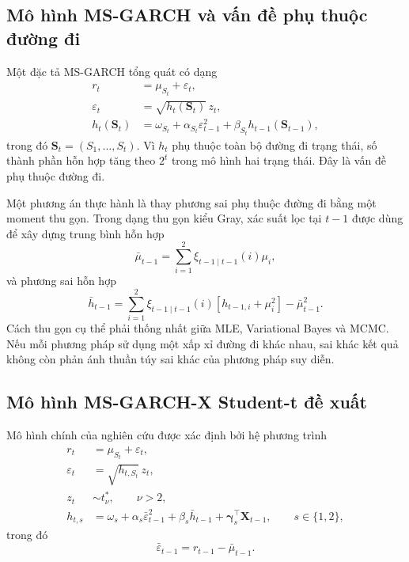 \documentclass[12pt,a4paper]{article}
\numberwithin{equation}{section}
\newcommand{\bm}[1]{\symbf{#1}}
\newcommand{\Xvec}{\bm{X}}
\begin{document}
\subsection{Mô hình MS-GARCH và vấn đề phụ thuộc đường đi}\label{subsec:msgarch-path}

Một đặc tả MS-GARCH tổng quát có dạng
\begin{align}
  r_t &= \mu_{S_t}+\varepsilon_t, \\
  \varepsilon_t &= \sqrt{h_t(\bm S_t)}\,z_t, \\
  h_t(\bm S_t)
  &=
  \omega_{S_t}
  +\alpha_{S_t}\varepsilon_{t-1}^{2}
  +\beta_{S_t}h_{t-1}(\bm S_{t-1}),
  \label{eq:path-dependent-msgarch}
\end{align}
trong đó $\bm S_t=(S_1,\ldots,S_t)$. Vì $h_t$ phụ thuộc toàn bộ đường đi trạng thái, số thành phần hỗn hợp tăng theo $2^t$ trong mô hình hai trạng thái. Đây là vấn đề phụ thuộc đường đi.

Một phương án thực hành là thay phương sai phụ thuộc đường đi bằng một moment thu gọn. Trong dạng thu gọn kiểu Gray, xác suất lọc tại $t-1$ được dùng để xây dựng trung bình hỗn hợp
\begin{equation}
  \bar\mu_{t-1}
  =
  \sum_{i=1}^{2}\xi_{t-1\mid t-1}(i)\mu_i,
  \label{eq:collapsed-mean}
\end{equation}
và phương sai hỗn hợp
\begin{equation}
  \bar h_{t-1}
  =
  \sum_{i=1}^{2}\xi_{t-1\mid t-1}(i)
  \left[h_{t-1,i}+\mu_i^2\right]
  -\bar\mu_{t-1}^{2}.
  \label{eq:collapsed-variance}
\end{equation}
Cách thu gọn cụ thể phải thống nhất giữa MLE, Variational Bayes và MCMC. Nếu mỗi phương pháp sử dụng một xấp xỉ đường đi khác nhau, sai khác kết quả không còn phản ánh thuần túy sai khác của phương pháp suy diễn.

\subsection{Mô hình MS-GARCH-X Student-t đề xuất}\label{subsec:main-model}

Mô hình chính của nghiên cứu được xác định bởi hệ phương trình
\begin{align}
  r_t &= \mu_{S_t}+\varepsilon_t, 
  \label{eq:main-mean}\\
  \varepsilon_t &= \sqrt{h_{t,S_t}}\,z_t,
  \label{eq:main-error}\\
  z_t &\sim t_{\nu}^{*},\qquad \nu>2,
  \label{eq:main-dist}\\
  h_{t,s}
  &=
  \omega_s
  +\alpha_s\bar\varepsilon_{t-1}^{2}
  +\beta_s\bar h_{t-1}
  +\bm\gamma_s^{\top}\Xvec_{t-1},
  \qquad s\in\{1,2\},
  \label{eq:main-variance}
\end{align}
trong đó
\begin{equation}
  \bar\varepsilon_{t-1}=r_{t-1}-\bar\mu_{t-1}.
  \label{eq:collapsed-residual}
\end{equation}
\end{document}
